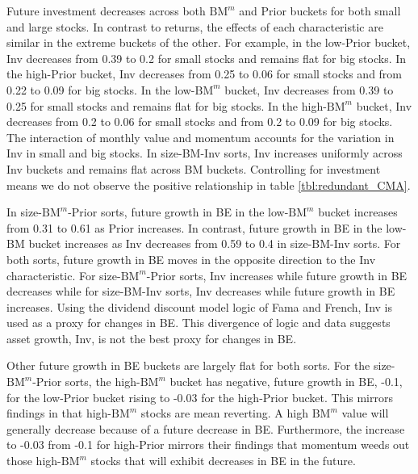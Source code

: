 Future investment decreases across both $\text{BM}^m$ and Prior buckets for
both small and large stocks. In contrast to returns, the effects of each
characteristic are similar in the extreme buckets of the other. For example, in
the low-Prior bucket, Inv decreases from 0.39 to 0.2 for small stocks and
remains flat for big stocks. In the high-Prior bucket, Inv decreases from 0.25
to 0.06 for small stocks and from 0.22 to 0.09 for big stocks. In the
low-$\text{BM}^m$ bucket, Inv decreases from 0.39 to 0.25 for small stocks and
remains flat for big stocks. In the high-$\text{BM}^m$ bucket, Inv decreases
from 0.2 to 0.06 for small stocks and from 0.2 to 0.09 for big stocks. The
interaction of monthly value and momentum accounts for the variation in Inv in
small and big stocks. In size-BM-Inv sorts, Inv increases uniformly across Inv
buckets and remains flat across BM buckets. Controlling for investment means we
do not observe the positive relationship in table \ref{tbl:redundant_CMA}.

In size-$\text{BM}^m$-Prior sorts, future growth in BE in the low-$\text{BM}^m$
bucket increases from 0.31 to 0.61 as Prior increases. In contrast, future
growth in BE in the low-BM bucket increases as Inv decreases from 0.59 to 0.4
in size-BM-Inv sorts. For both sorts, future growth in BE moves in the opposite
direction to the Inv characteristic. For size-$\text{BM}^m$-Prior sorts, Inv
increases while future growth in BE decreases while for size-BM-Inv sorts, Inv
decreases while future growth in BE increases. Using the dividend discount
model logic of Fama and French, Inv is used as a proxy for changes in BE. This
divergence of logic and data suggests asset growth, Inv, is not the best proxy
for changes in BE.

Other future growth in BE buckets are largely flat for both sorts. For the
size-$\text{BM}^m$-Prior sorts, the high-$\text{BM}^m$ bucket has negative,
future growth in BE, -0.1, for the low-Prior bucket rising to -0.03 for the
high-Prior bucket. This mirrors findings in \textcite{kok2017facts} that
high-$\text{BM}^m$ stocks are mean reverting. A high $\text{BM}^m$ value will
generally decrease because of a future decrease in BE. Furthermore, the
increase to -0.03 from -0.1
for high-Prior mirrors their findings that momentum weeds out
those high-$\text{BM}^m$ stocks that will exhibit decreases in BE in the
future.
